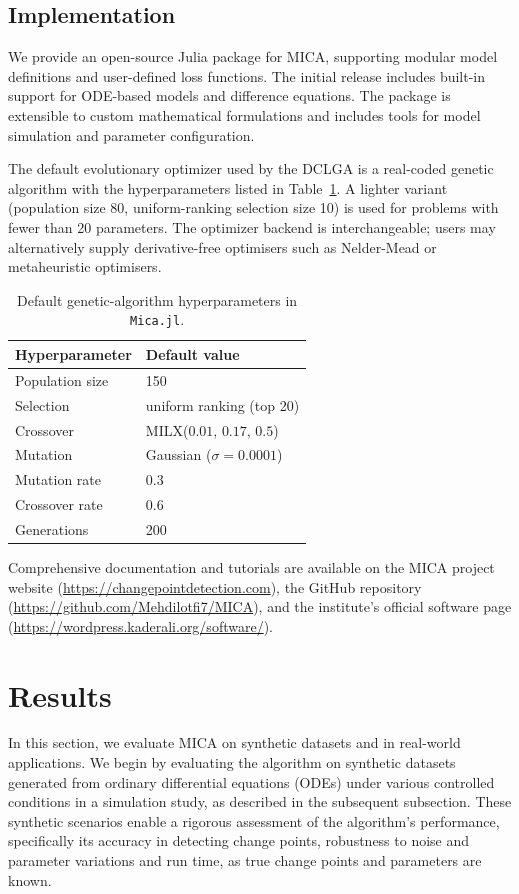 \documentclass[10pt,letterpaper]{article}
\begin{document}
\subsection*{Implementation}

We provide an open-source Julia package for MICA, supporting modular model definitions and user-defined loss functions. The initial release includes built-in support for ODE-based models and difference equations. The package is extensible to custom mathematical formulations and includes tools for model simulation and parameter configuration.

The default evolutionary optimizer used by the DCLGA is a real-coded genetic algorithm with the hyperparameters listed in Table~\ref{tab:ga-hyperparameters}. A lighter variant (population size 80, uniform-ranking selection size 10) is used for problems with fewer than 20 parameters. The optimizer backend is interchangeable; users may alternatively supply derivative-free optimisers such as Nelder-Mead or metaheuristic optimisers.

\begin{table}[h]
\centering
\caption{Default genetic-algorithm hyperparameters in \texttt{Mica.jl}.}
\label{tab:ga-hyperparameters}
\begin{tabular}{ll}
\toprule
\textbf{Hyperparameter} & \textbf{Default value} \\
\midrule
Population size & 150 \\
Selection & uniform ranking (top 20) \\
Crossover & MILX($0.01$, $0.17$, $0.5$) \\
Mutation & Gaussian ($\sigma = 0.0001$) \\
Mutation rate & 0.3 \\
Crossover rate & 0.6 \\
Generations & 200 \\
\bottomrule
\end{tabular}
\end{table}

Comprehensive documentation and tutorials are available on the MICA project website (\url{https://changepointdetection.com}), the GitHub repository (\url{https://github.com/Mehdilotfi7/MICA}), and the institute's official software page (\url{https://wordpress.kaderali.org/software/}).




\section*{Results}
In this section, we evaluate MICA on synthetic datasets and in real-world applications. We begin by evaluating the algorithm on synthetic datasets generated from ordinary differential equations (ODEs) under various controlled conditions in a simulation study, as described in the subsequent subsection. These synthetic scenarios enable a rigorous assessment of the algorithm’s performance, specifically its accuracy in detecting change points, robustness to noise and parameter variations and run time, as true change points and parameters are known.
\end{document}
